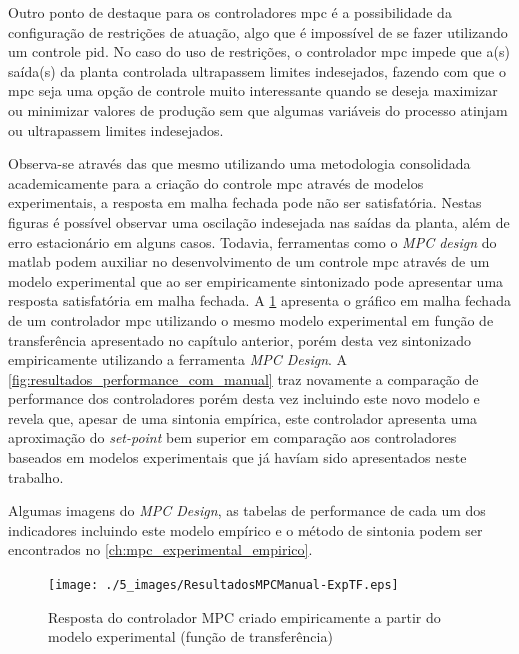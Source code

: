 Outro ponto de destaque para os controladores \acrshort{mpc} é a possibilidade da configuração de
restrições de atuação, algo que é impossível de se fazer utilizando um controle \acrshort{pid}.
No caso do uso de restrições, o controlador \acrshort{mpc} impede que a(s) saída(s) da planta controlada
ultrapassem limites indesejados, fazendo com que o \acrshort{mpc} seja uma opção de controle muito
interessante quando se deseja maximizar ou minimizar valores de produção sem que algumas variáveis
do processo atinjam ou ultrapassem limites indesejados.

Observa-se através das  que mesmo utilizando
uma metodologia consolidada academicamente para a criação do controle \acrshort{mpc} através de modelos
experimentais, a resposta em malha fechada pode não ser satisfatória. Nestas figuras é possível 
observar uma oscilação indesejada nas saídas da planta, além de erro estacionário em alguns casos.
Todavia, ferramentas como o \textit{MPC design} do \acrshort{matlab} podem auxiliar no desenvolvimento
de um controle \acrshort{mpc} através de um modelo experimental que ao ser empiricamente sintonizado
pode apresentar uma resposta satisfatória em malha fechada. A \cref{fig:resultadosmpcmanual-exptf}
apresenta o gráfico em malha fechada de um controlador \acrshort{mpc} utilizando o mesmo modelo experimental em
função de transferência apresentado no capítulo anterior, porém desta vez sintonizado empiricamente utilizando
a ferramenta \textit{MPC Design}. A \cref{fig:resultados_performance_com_manual} traz novamente a
comparação de performance dos controladores porém desta vez incluindo este novo modelo e revela que, apesar de uma
sintonia empírica, este controlador apresenta uma aproximação do \textit{set-point} bem superior em comparação
aos controladores baseados em  modelos experimentais que já havíam sido apresentados neste trabalho.

Algumas imagens do \textit{MPC Design}, as tabelas de performance de cada um dos indicadores
incluindo este modelo empírico e o método de sintonia podem ser encontrados no \cref{ch:mpc_experimental_empirico}.

\begin{figure}[!h]
	\caption{Resposta do controlador MPC criado empiricamente a partir do modelo experimental (função de transferência)}
	\begin{center}
		\texttt{[image: ./5\_images/ResultadosMPCManual-ExpTF.eps]} 
		\label{fig:resultadosmpcmanual-exptf}
	\end{center}
	\centering
\end{figure}

